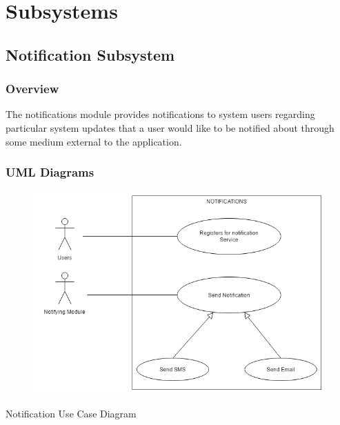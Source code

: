 \documentclass{article}
\begin{document}
\section{Subsystems}
\subsection{Notification Subsystem}
\subsubsection{Overview}
The notifications module provides notifications to system users regarding
particular system updates that a user would like to be notified about through
some medium external to the application.


\subsubsection{UML Diagrams}	
\begin{figure}[h!]
  \includegraphics[width=\textwidth]{Notifications_Use_Case.png}
\end{figure}
Notification Use Case Diagram

\mbox{}\\
\bigskip
\clearpage
\end{document}
